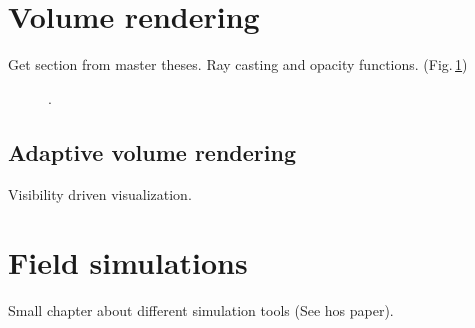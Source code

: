 
																						


\section{Volume rendering}\label{sec:volren}

Get section from master theses. Ray casting and opacity functions. (Fig.\,\ref{fig:vr})

\begin{figure}
\centering
{}
\caption{.}
\label{fig:vr}
\end{figure}

\subsection{Adaptive volume rendering}

Visibility driven visualization.

\section{Field simulations}\label{sec:field}

Small chapter about different simulation tools (See hos paper).
			
\endinput
